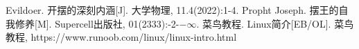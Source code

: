 \documentclass[12pt,a4paper]{article}%
\begin{document}
%
%
\newpage
\begin{thebibliography}{99}%
	Evildoer. 开摆的深刻内涵[J]. 大学物理, 11.4(2022):1-4.
	Propht Joseph. 摆王的自我修养[M]. Supercell出版社, 01(2333):-2-$-\infty$.
	菜鸟教程. Linux简介[EB/OL]. 菜鸟教程, https://www.runoob.com/linux/linux-intro.html
\end{thebibliography}
\end{document}
